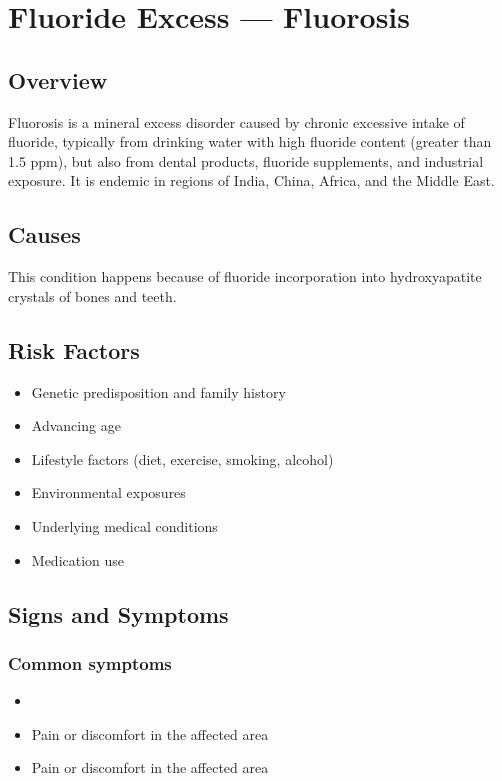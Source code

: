 \chapter{Fluoride Excess --- Fluorosis}
\label{sec:Fluorosis}

\section{Overview}
Fluorosis is a mineral excess disorder caused by chronic excessive intake of fluoride, typically from drinking water with high fluoride content (greater than 1.5 ppm), but also from dental products, fluoride supplements, and industrial exposure. It is endemic in regions of India, China, Africa, and the Middle East.
\section{Causes}
This condition happens because of fluoride incorporation into hydroxyapatite crystals of bones and teeth.     
\section{Risk Factors}

\begin{itemize}[noitemsep]
  \item Genetic predisposition and family history
  \item Advancing age
  \item Lifestyle factors (diet, exercise, smoking, alcohol)
  \item Environmental exposures
  \item Underlying medical conditions
  \item Medication use
\end{itemize}
\section{Signs and Symptoms}

\subsection{Common symptoms}
\begin{itemize}[noitemsep]
  \item \item Pain or discomfort in the affected area    \item Pain or discomfort in the affected area
  \end{itemize}

